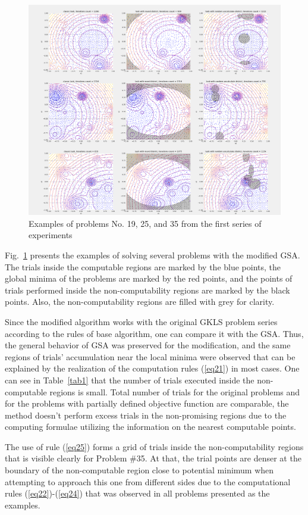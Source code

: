 \documentclass[runningheads]{llncs}
\begin{document}
\begin{figure}[h]
\includegraphics[width=\textwidth]{fig6.png}
\caption{Examples of problems No. 19, 25, and 35 from the first series of experiments} \label{fig6}
\end{figure}

Fig.~\ref{fig6} presents the examples of solving several problems with the modified GSA. The trials inside the computable regions are marked by the blue points, the global minima of the problems are marked by the red points, and the points of trials performed inside the non-computability regions are marked by the black points. Also, the non-computability regions are filled with grey for clarity.

Since the modified algorithm works with the original GKLS problem series according to the rules of base algorithm, one can compare it with the GSA. Thus, the general behavior of GSA was preserved for the modification, and the same regions of trials' accumulation near the local minima were observed that can be explained by the realization of the  computation rules (\ref{eq21}) in most cases. One can see in Table~\ref{tab1} that the number of trials executed inside the non-computable regions is small. Total number of trials for the original problems and for the problems with partially defined objective function are comparable, the method doesn't perform excess trials in the non-promising regions due to the computing formulae utilizing the information on the nearest computable points.

The use of rule (\ref{eq25}) forms a grid of trials inside the non-computability regions that is visible clearly for Problem \#35. At that, the trial points are denser at the boundary of the non-computable region close to potential minimum when attempting to approach this one from different sides due to the computational rules (\ref{eq22})-(\ref{eq24}) that was observed in all problems presented as the examples. 
\end{document}
